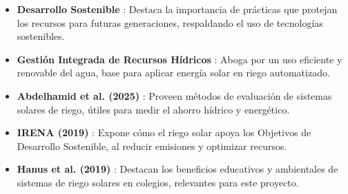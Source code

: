 \documentclass[12pt]{article}
\begin{document}
\begin{itemize}
      \item \textbf{Desarrollo Sostenible} \cite{Brundtland1987}: Destaca la importancia de prácticas que protejan los recursos para futuras generaciones, respaldando el uso de tecnologías sostenibles.
      \item \textbf{Gestión Integrada de Recursos Hídricos} \cite{GWP2000}: Aboga por un uso eficiente y renovable del agua, base para aplicar energía solar en riego automatizado.
      \item \textbf{Abdelhamid et al. (2025)} \cite{Abdelhamid2025}: Proveen métodos de evaluación de sistemas solares de riego, útiles para medir el ahorro hídrico y energético.
      \item \textbf{IRENA (2019)} \cite{IRENA2019}: Expone cómo el riego solar apoya los Objetivos de Desarrollo Sostenible, al reducir emisiones y optimizar recursos.
      \item \textbf{Hanus et al. (2019)} \cite{Hanus2019}: Destacan los beneficios educativos y ambientales de sistemas de riego solares en colegios, relevantes para este proyecto.
\end{itemize}

\end{document}
